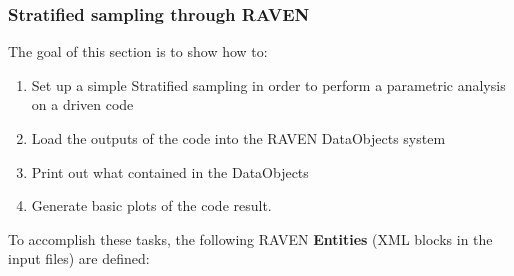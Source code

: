 \subsubsection{Stratified sampling through RAVEN}
\label{subsub:Stratifiedexample}
The goal of this section is to show how to:
 \begin{enumerate}
   \item Set up a simple Stratified sampling in order to perform a parametric analysis on a driven code
   \item Load the outputs of the code into the RAVEN DataObjects system
   \item Print out what contained in the DataObjects
   \item Generate basic plots of the code result.
\end{enumerate}  
To accomplish these tasks, the following RAVEN \textbf{Entities} (XML blocks in the input files) are defined:
